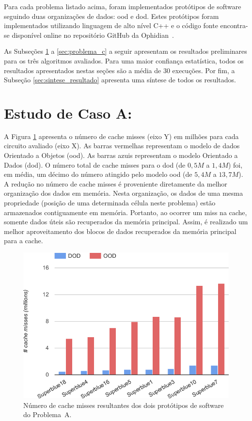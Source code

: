 Para cada problema listado acima, foram implementados protótipos de software seguindo duas organizações de dados: \ac{ood} e \ac{dod}.
Estes protótipos foram implementados utilizando linguagem de alto nível C++ e o código fonte encontra-se disponível online no repositório GitHub da Ophidian~\cite{ophidian}.

As Subseções \ref{sec:problema_a} a \ref{sec:problema_c} a seguir apresentam os resultados preliminares para os três algoritmos avaliados.
Para uma maior confiança estatística, todos os resultados apresentados nestas seções são a média de 30 execuções.
Por fim, a Subseção \ref{sec:sintese_resultado} apresenta uma síntese de todos os resultados.

\section{Estudo de Caso A:}
\label{sec:problema_a}

A Figura \ref{fig:missProblemA} apresenta o número de cache misses (eixo Y) em milhões para cada circuito avaliado (eixo X). As barras vermelhas representam o modelo de dados Orientado a Objetos (\ac{ood}). As barras azuis representam o modelo Orientado a Dados (\ac{dod}). O número total de cache misses para o \ac{dod} (de $0,5M$ a $1,4M$) foi, em média, um décimo do número atingido pelo modelo \ac{ood} (de $5,4M$ a $13,7M$). A redução no número de cache misses é proveniente diretamente da melhor organização dos dados em memória. Nesta organização, os dados de uma mesma propriedade (posição de uma determinada célula neste problema) estão armazenados contiguamente em memória. Portanto, ao ocorrer um miss na cache, somente dados úteis são recuperados da memória principal. Assim, é realizado um melhor aproveitamento dos blocos de dados recuperados da memória principal para a cache.

\begin{figure}[ht]
    \centering
    \includegraphics[width=0.65\linewidth]{img/results/missProblemA}
    \caption[Cache misses do Problema~A.]{Número de cache misses resultantes dos dois protótipos de software do Problema~A.}
    \label{fig:missProblemA}
\end{figure}


